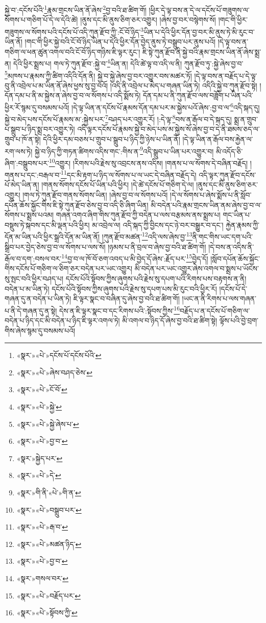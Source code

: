 སྐྱེ་བ་:དངོས་པོའི་\footnote{«སྣར་»«པེ་»དངོས་པོ་དངོས་པོའི་}རྣམ་གྲངས་ཡིན་ནོ་ཞེས་\footnote{«སྣར་»«པེ་»ཞེས་བཤད་ཅེས་}བྱ་བའི་ཐ་ཚིག་གོ། །ཕྱིར་དེ་ལྟ་བས་ན་དེ་ལ་དངོས་པོ་གཟུགས་ལ་སོགས་པ་གཅིག་པོ་དེ་ལ་དེའི་ཚེ། །ནུས་དང་མི་ནུས་ཅིག་ཅར་འགྱུར། །ཞེས་བྱ་བར་བསྙེགས་སོ། །གང་གི་ཕྱིར་གཟུགས་ལ་སོགས་པའི་དངོས་པོ་འདི་ཀུན་རྫོབ་ཀྱི་:ངོ་བོ་ཉིད་\footnote{«སྣར་»«པེ་»ངོ་བོ་}ཡིན་པ་དེའི་ཕྱིར་དོན་བྱ་བར་མི་ནུས་ཏེ་མི་རུང་བ་ཡིན་ནོ། །གང་གི་ཕྱིར་སྐྱེ་བའི་ངོ་བོ་ཉིད་ཡིན་པ་དེའི་ཕྱིར་དོན་བྱེད་ནུས་ཏེ་བསྒྲུབ་པར་ནུས་པའོ། །དེ་ལྟ་བས་ན་གཅིག་ལ་ཕན་ཚུན་འགལ་བའི་ངོ་བོ་ཉིད་གཉིས་ཇི་ལྟར་རུང་། ཇི་སྟེ་ཀུན་རྫོབ་ནི་སྐྱེ་བའི་རྣམ་གྲངས་ཡིན་ནོ་ཞེས་སྨྲ་ན། དེའི་ཕྱིར་སྨྲས་པ། གལ་ཏེ་ཀུན་རྫོབ་:སྐྱེ་བ་\footnote{«སྣར་»«པེ་»སྐྱེ་}ཡིན་ན། དེའི་ཚེ་ལྟ་བ་འདི་ལ་ནི། ཀུན་རྫོབ་ཏུ་:སྐྱེ་ཞེས་བྱ་བ་\footnote{«སྣར་»«པེ་»སྐྱེ་ཞེས་པ་}མཁས་པ་རྣམས་ཀྱི་ཚིག་འདིའི་དོན་ནི། སྐྱེ་བ་སྐྱེ་ཞེས་བྱ་བར་འགྱུར་བས་མཚར་ཏོ། །དེ་ལྟ་བས་ན་བརྗོད་པ་དེ་ལྟ་བུ་ནི་འབྲེལ་པ་མ་ཡིན་ནོ་ཞེས་ཕྱས་སུ་བྱ་བའོ། །འདི་ནི་འབྲེལ་པ་མེད་པ་གཞན་ཡིན་ཏེ། འདིའི་སྐྱེ་བ་ཀུན་རྫོབ་སྟེ། །དོན་དམ་པ་ནི་མ་སྐྱེས་ན་ཞེས་བྱ་བ་ལ་སོགས་པ་འདི་སྨོས་ཏེ། དོན་དམ་པ་ནི་ཀུན་རྫོབ་ལས་བཟློག་པ་ཡིན་པའི་ཕྱིར་རོ་སྙམ་དུ་བསམས་པའོ། །དེ་ལྟ་ཡིན་ན་དངོས་པོ་རྣམས་དོན་དམ་པར་མ་སྐྱེས་པའོ་ཞེས་:བྱ་བ་ལ་\footnote{«སྣར་»«པེ་»བྱ་བ་}འདི་སྐད་དུ། སྐྱེ་བ་མེད་པས་དངོས་པོ་རྣམས་མ་:སྐྱེས་པར་\footnote{«སྣར་»སྐྱེད་པར་}བཤད་པར་འགྱུར་རོ། །:དེ་ལྟ་\footnote{«སྣར་»«པེ་»དེ་}བས་ན་རྒོལ་བ་དེ་སྐད་དུ། སྨྲ་ན་གྲུབ་པ་སྒྲུབ་པ་ཉིད་སྨྲ་བར་འགྱུར་ཏེ། འདི་ལྟར་དངོས་པོ་རྣམས་སྐྱེ་བ་མེད་པས་མ་སྐྱེས་སོ་ཞེས་བྱ་བ་དེ་ནི་ཐམས་ཅད་ལ་གྲུབ་པ་ཁོ་ན་སྟེ། དེའི་ཕྱིར་དམ་བཅས་པ་གྲུབ་པ་སྒྲུབ་པ་ཉིད་ཀྱི་ཉེས་པ་ཡིན་ནོ། །དེ་ལྟ་ཡིན་ན་རྒོལ་བས་རྐྱེན་ལ་རག་ལས་ཏེ། སྐྱེ་བ་ཉིད་ཀྱི་གཏན་ཚིགས་འདིས་གང་:གིས་ན་\footnote{«སྣར་»གི་ནི་«པེ་»གི་ན་}འདི་སྒྲུབ་པ་ཡིན་པར་འགྱུར་བ། མི་འདོད་ཅི་ཞིག་:བསྒྲུབས་པར་\footnote{«སྣར་»«པེ་»བསྒྲུབ་པར་}འགྱུར། །རིགས་པའི་རྗེས་སུ་འབྲངས་ནས་འདིས། །གནས་པ་ལ་སོགས་དེ་བཞིན་བརྗོད། །གནས་པ་དང་:བརྒལ་བ་\footnote{«སྣར་»«པེ་»རྒ་བ་}དང་མི་རྟག་པ་ཉིད་ལ་སོགས་པ་ལ་ཡང་དེ་བཞིན་བརྗོད་དེ། འདི་ལྟར་ཀུན་རྫོབ་དངོས་པོ་མེད་ཡིན་ན། །གནས་སོགས་དངོས་པོ་ཡིན་པའི་ཕྱིར། །དེ་ཚེ་དངོས་པོ་གཅིག་དེ་ལ། །ནུས་དང་མི་ནུས་ཅིག་ཅར་འགྱུར། །གལ་ཏེ་ཀུན་རྫོབ་གནས་སོགས་ཡིན། །ཞེས་བྱ་བ་ལ་སོགས་པའོ། །དེ་ལ་སོགས་པ་ཞེས་སྨོས་པ་ནི་སློབ་དཔོན་ཆོས་སྐྱོང་གིས་ཇི་སྟེ་ཀུན་རྫོབ་ཅེས་བྱ་བ་འདི་ཅི་ཞིག་ཡིན། མི་བདེན་པའི་རྣམ་གྲངས་ཡིན་ནམ་ཞེས་བྱ་བ་ལ་སོགས་པ་སྨྲས་པའམ། གཞན་འགའ་ཞིག་གིས་ཀུན་རྫོབ་ཀྱི་བདེན་པ་ལས་བརྩམས་ནས་སྨྲས་པ། གང་ཡིན་པ་བསྡུས་ཏེ་སྐབས་དང་མི་ལྡན་པའི་ཕྱིར། མ་འབྲེལ་ལ། འདི་སྐད་ཀྱི་བྱིངས་དང་ཉེ་བར་བསྒྱུར་བ་དང་། རྐྱེན་རྣམས་ཀྱི་དོན་མ་ཡིན་པའི་ཕྱིར་སྒྲའི་དོན་མ་ཡིན་ནོ། །ཀུན་རྫོབ་མཚན་\footnote{«སྣར་»«པེ་»མཚན་ཉིད་}འདི་ལས་ཞེས་བྱ་\footnote{«སྣར་»«པེ་»བྱ་བ་}ནི་གང་གིས་ཡང་དག་པའི་སྒྲིབ་པར་བྱེད་ཅེས་བྱ་བ་ལ་སོགས་པ་ལས་སོ། །ཉམས་པ་ནི་བྲལ་བ་ཞེས་བྱ་བའི་ཐ་ཚིག་གོ། །དེ་བས་ན་འདིས་ནི་རྒོལ་བ་དག་:བསལ་བར་\footnote{«སྣར་»གསལ་བར་}བྱ་བ་ལ་ཁོ་བོ་ཅག་འབད་པ་མི་བྱེད་དོ་ཞེས་:རྗོད་པར་\footnote{«སྣར་»«པེ་»བརྗོད་པར་}བྱེད་དོ། །སློབ་དཔོན་ཆོས་སྐྱོང་གིས་དངོས་པོ་གཅིག་ལ་ཅིག་ཅར་བདེན་པར་ཡང་འགྱུར། མི་བདེན་པར་ཡང་འགྱུར་ཞེས་འགལ་བ་སྨྲས་པ་ཡོངས་སུ་སྤང་བའི་ཕྱིར་བཤད་པ། དངོས་པོའི་སྟོབས་ཀྱིས་ཞུགས་པའི་རྗེས་སུ་དཔག་པའི་རིགས་པས་བརྟགས་ན་ནི། བདེན་པ་མ་ཡིན་ཏེ། དངོས་པོའི་སྟོབས་ཀྱིས་ཞུགས་པའི་རྗེས་སུ་དཔག་པས་མི་རུང་བའི་ཕྱིར་རོ། །དངོས་པོ་དེ་གཞན་དུ་ན་བདེན་པ་ཡིན་ཏེ། ཇི་ལྟར་སྣང་བ་བཞིན་དུ་ཞེས་བྱ་བའི་ཐ་ཚིག་གོ། །ཡང་ན་ནི་རིགས་པ་ལས་གཞན་པ་ནི་དེ་གཞན་དུ་ན་སྟེ། དེས་ན་ཇི་ལྟར་སྣང་བ་དང་རིགས་པའི་:སྟོབས་ཀྱིས་\footnote{«སྣར་»«པེ་»སྟོབས་ཀྱི་}བརྗོད་པ་ན་དངོས་པོ་གཅིག་ལ་བདེན་པ་ཉིད་དང་མི་བདེན་པ་ཉིད་ཇི་ལྟར་འགལ་ཏེ། མི་འགལ་བ་ཉིད་དོ་ཞེས་བྱ་བའི་ཐ་ཚིག་སྟེ། ལྟོས་པའི་བྱེ་བྲག་གིས་ཞེས་སྙམ་དུ་བསམས་པའོ། 